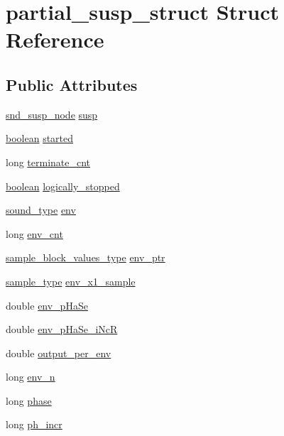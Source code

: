 \hypertarget{structpartial__susp__struct}{}\section{partial\+\_\+susp\+\_\+struct Struct Reference}
\label{structpartial__susp__struct}
\subsection*{Public Attributes}
\begin{DoxyCompactItemize}
\item 
\hyperlink{sound_8h_a6b268203688a934bd798ceb55f85d4c0}{snd\+\_\+susp\+\_\+node} \hyperlink{structpartial__susp__struct_abae80401486137fab1d874ce24107df5}{susp}
\item 
\hyperlink{cext_8h_a7670a4e8a07d9ebb00411948b0bbf86d}{boolean} \hyperlink{structpartial__susp__struct_a473ea2fccd7be094ff4216e88baa22f5}{started}
\item 
long \hyperlink{structpartial__susp__struct_a88e1f562fa6881f6f2d04740d865cb30}{terminate\+\_\+cnt}
\item 
\hyperlink{cext_8h_a7670a4e8a07d9ebb00411948b0bbf86d}{boolean} \hyperlink{structpartial__susp__struct_a92114b0a49725c7d84d8d8f7f087c808}{logically\+\_\+stopped}
\item 
\hyperlink{sound_8h_a792cec4ed9d6d636d342d9365ba265ea}{sound\+\_\+type} \hyperlink{structpartial__susp__struct_a308009ae9a96854c2071a9badae7e284}{env}
\item 
long \hyperlink{structpartial__susp__struct_a4e6b28037495dc5ae90437f5fe17b35c}{env\+\_\+cnt}
\item 
\hyperlink{sound_8h_a83d17f7b465d1591f27cd28fc5eb8a03}{sample\+\_\+block\+\_\+values\+\_\+type} \hyperlink{structpartial__susp__struct_a14af2a77a380e3497e43985d0f45850d}{env\+\_\+ptr}
\item 
\hyperlink{sound_8h_a3a9d1d4a1c153390d2401a6e9f71b32c}{sample\+\_\+type} \hyperlink{structpartial__susp__struct_a1ebbdc267ee85871fd0548c3aab329a4}{env\+\_\+x1\+\_\+sample}
\item 
double \hyperlink{structpartial__susp__struct_aaf189d80750cc56596f09fd7be1458e6}{env\+\_\+p\+Ha\+Se}
\item 
double \hyperlink{structpartial__susp__struct_a6ee7ecf18c92cb3b0556b240278d4519}{env\+\_\+p\+Ha\+Se\+\_\+i\+NcR}
\item 
double \hyperlink{structpartial__susp__struct_abe3ddb92c09463c16cf3f878b1a07bce}{output\+\_\+per\+\_\+env}
\item 
long \hyperlink{structpartial__susp__struct_a620ceda4768e7da0ed42ebba77453450}{env\+\_\+n}
\item 
long \hyperlink{structpartial__susp__struct_a643538e666d21828691b39e12f52c9bc}{phase}
\item 
long \hyperlink{structpartial__susp__struct_a1057f1c4b7ab9179c9b1852110a58356}{ph\+\_\+incr}
\end{DoxyCompactItemize}


